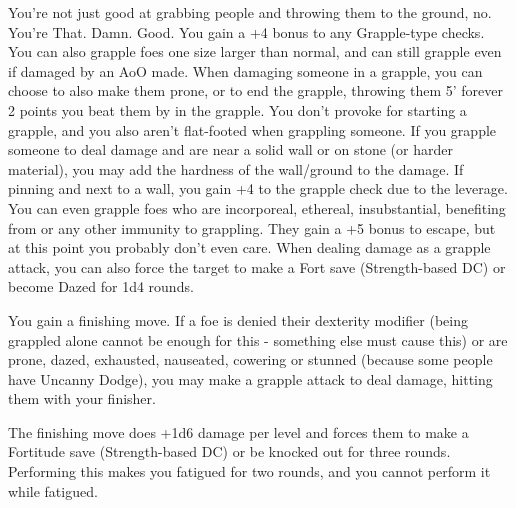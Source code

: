 \begin{multicols}{2}
\label{comm:feat:legendarywrestler}{}
{You're not just good at grabbing people and throwing them to the ground, no. You're That. Damn. Good.
}{You gain a +4 bonus to any Grapple-type checks. You can also grapple foes one size larger than normal, and can still grapple even if damaged by an AoO made.
}{ When damaging someone in a grapple, you can choose to also make them prone, or to end the grapple, throwing them 5' forever 2 points you beat them by in the grapple.
}{You don't provoke for starting a grapple, and you also aren't flat-footed when grappling someone. If you grapple someone to deal damage and are near a solid wall or on stone (or harder material), you may add the hardness of the wall/ground to the damage. If pinning and next to a wall, you gain +4 to the grapple check due to the leverage.
}{You can even grapple foes who are incorporeal, ethereal, insubstantial, benefiting from  or any other immunity to grappling. They gain a +5 bonus to escape, but at this point you probably don't even care. When dealing damage as a grapple attack, you can also force the target to make a Fort save (Strength-based DC) or become Dazed for 1d4 rounds.
}{You gain a finishing move. If a foe is denied their dexterity modifier (being grappled alone cannot be enough for this - something else must cause this) or are prone, dazed, exhausted, nauseated, cowering or stunned (because some people have Uncanny Dodge), you may make a grapple attack to deal damage, hitting them with your finisher.

The finishing move does +1d6 damage per level and forces them to make a Fortitude save (Strength-based DC) or be knocked out for three rounds. Performing this makes you fatigued for two rounds, and you cannot perform it while fatigued.}


\end{multicols}

